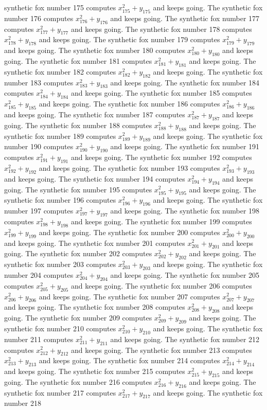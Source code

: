 \documentclass{article}
\begin{document}
synthetic fox number 175 computes $x_{175}^2 + y_{175}$ and keeps going. The synthetic fox number 176 computes $x_{176}^2 + y_{176}$ and keeps going. The synthetic fox number 177 computes $x_{177}^2 + y_{177}$ and keeps going. The synthetic fox number 178 computes $x_{178}^2 + y_{178}$ and keeps going. The synthetic fox number 179 computes $x_{179}^2 + y_{179}$ and keeps going. The synthetic fox number 180 computes $x_{180}^2 + y_{180}$ and keeps going. The synthetic fox number 181 computes $x_{181}^2 + y_{181}$ and keeps going. The synthetic fox number 182 computes $x_{182}^2 + y_{182}$ and keeps going. The synthetic fox number 183 computes $x_{183}^2 + y_{183}$ and keeps going. The synthetic fox number 184 computes $x_{184}^2 + y_{184}$ and keeps going. The synthetic fox number 185 computes $x_{185}^2 + y_{185}$ and keeps going. The synthetic fox number 186 computes $x_{186}^2 + y_{186}$ and keeps going. The synthetic fox number 187 computes $x_{187}^2 + y_{187}$ and keeps going. The synthetic fox number 188 computes $x_{188}^2 + y_{188}$ and keeps going. The synthetic fox number 189 computes $x_{189}^2 + y_{189}$ and keeps going. The synthetic fox number 190 computes $x_{190}^2 + y_{190}$ and keeps going. The synthetic fox number 191 computes $x_{191}^2 + y_{191}$ and keeps going. The synthetic fox number 192 computes $x_{192}^2 + y_{192}$ and keeps going. The synthetic fox number 193 computes $x_{193}^2 + y_{193}$ and keeps going. The synthetic fox number 194 computes $x_{194}^2 + y_{194}$ and keeps going. The synthetic fox number 195 computes $x_{195}^2 + y_{195}$ and keeps going. The synthetic fox number 196 computes $x_{196}^2 + y_{196}$ and keeps going. The synthetic fox number 197 computes $x_{197}^2 + y_{197}$ and keeps going. The synthetic fox number 198 computes $x_{198}^2 + y_{198}$ and keeps going. The synthetic fox number 199 computes $x_{199}^2 + y_{199}$ and keeps going. The synthetic fox number 200 computes $x_{200}^2 + y_{200}$ and keeps going. The synthetic fox number 201 computes $x_{201}^2 + y_{201}$ and keeps going. The synthetic fox number 202 computes $x_{202}^2 + y_{202}$ and keeps going. The synthetic fox number 203 computes $x_{203}^2 + y_{203}$ and keeps going. The synthetic fox number 204 computes $x_{204}^2 + y_{204}$ and keeps going. The synthetic fox number 205 computes $x_{205}^2 + y_{205}$ and keeps going. The synthetic fox number 206 computes $x_{206}^2 + y_{206}$ and keeps going. The synthetic fox number 207 computes $x_{207}^2 + y_{207}$ and keeps going. The synthetic fox number 208 computes $x_{208}^2 + y_{208}$ and keeps going. The synthetic fox number 209 computes $x_{209}^2 + y_{209}$ and keeps going. The synthetic fox number 210 computes $x_{210}^2 + y_{210}$ and keeps going. The synthetic fox number 211 computes $x_{211}^2 + y_{211}$ and keeps going. The synthetic fox number 212 computes $x_{212}^2 + y_{212}$ and keeps going. The synthetic fox number 213 computes $x_{213}^2 + y_{213}$ and keeps going. The synthetic fox number 214 computes $x_{214}^2 + y_{214}$ and keeps going. The synthetic fox number 215 computes $x_{215}^2 + y_{215}$ and keeps going. The synthetic fox number 216 computes $x_{216}^2 + y_{216}$ and keeps going. The synthetic fox number 217 computes $x_{217}^2 + y_{217}$ and keeps going. The synthetic fox number 218 
\end{document}
